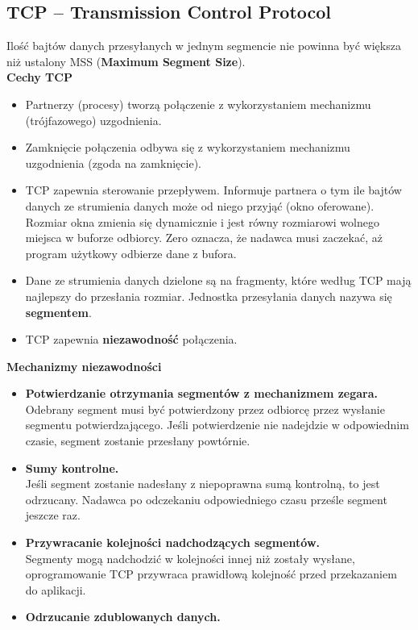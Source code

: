 \documentclass[../main.tex]{subfiles}
\begin{document}
    \subsection{TCP – Transmission Control Protocol}
    Ilość bajtów danych przesyłanych w jednym segmencie nie powinna być większa niż ustalony MSS (\textbf{Maximum Segment Size}).\\

    \textbf{Cechy TCP}
    \begin{itemize}
        \item Partnerzy (procesy) tworzą połączenie z wykorzystaniem mechanizmu (trójfazowego) uzgodnienia.
        \item Zamknięcie połączenia odbywa się z wykorzystaniem mechanizmu uzgodnienia (zgoda na zamknięcie).
        \item TCP zapewnia sterowanie przepływem. Informuje partnera o tym ile bajtów danych ze strumienia danych może od niego przyjąć (okno oferowane). Rozmiar okna zmienia się dynamicznie i jest równy rozmiarowi wolnego miejsca w buforze odbiorcy. Zero oznacza, że nadawca musi zaczekać, aż program użytkowy
        odbierze dane z bufora.
        \item Dane ze strumienia danych dzielone są na fragmenty, które według TCP mają najlepszy
        do przesłania rozmiar. Jednostka przesyłania danych nazywa się \textbf{segmentem}.
        \item TCP zapewnia \textbf{niezawodność} połączenia.
    \end{itemize}

    \textbf{Mechanizmy niezawodności}
    \begin{itemize}
        \item \textbf{Potwierdzanie otrzymania segmentów z mechanizmem zegara.}\\
        Odebrany segment musi być potwierdzony przez odbiorcę przez wysłanie segmentu potwierdzającego. Jeśli
        potwierdzenie nie nadejdzie w odpowiednim czasie, segment zostanie przesłany powtórnie.
        \item \textbf{Sumy kontrolne.}\\
        Jeśli segment zostanie nadesłany z niepoprawna sumą kontrolną, to jest
        odrzucany. Nadawca po odczekaniu odpowiedniego czasu prześle segment jeszcze raz.
        \item \textbf{Przywracanie kolejności nadchodzących segmentów.}\\
        Segmenty mogą nadchodzić w kolejności innej niż zostały wysłane, oprogramowanie TCP przywraca prawidłową kolejność przed przekazaniem do aplikacji.
        \item \textbf{Odrzucanie zdublowanych danych.}
    \end{itemize}
\end{document}
